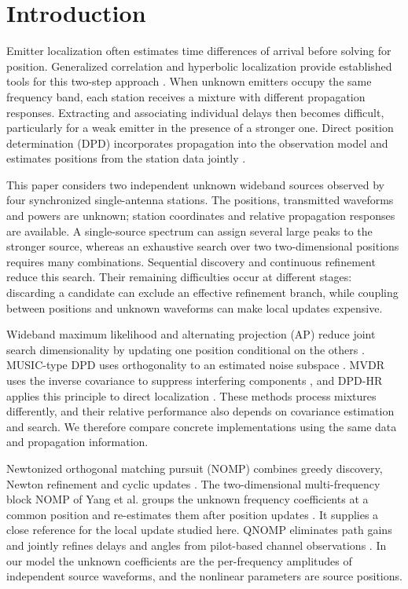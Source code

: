 \documentclass[a4paper,fleqn,review]{cas-sc}
\begin{document}
\FloatBarrier
\section{Introduction}
Emitter localization often estimates time differences of arrival before solving for position. Generalized correlation and hyperbolic localization provide established tools for this two-step approach \cite{KnappCarter1976,ChanHo1994}. When unknown emitters occupy the same frequency band, each station receives a mixture with different propagation responses. Extracting and associating individual delays then becomes difficult, particularly for a weak emitter in the presence of a stronger one. Direct position determination (DPD) incorporates propagation into the observation model and estimates positions from the station data jointly \cite{ChenHudsonYao2002,WeissAmar2005}.

This paper considers two independent unknown wideband sources observed by four synchronized single-antenna stations. The positions, transmitted waveforms and powers are unknown; station coordinates and relative propagation responses are available. A single-source spectrum can assign several large peaks to the stronger source, whereas an exhaustive search over two two-dimensional positions requires many combinations. Sequential discovery and continuous refinement reduce this search. Their remaining difficulties occur at different stages: discarding a candidate can exclude an effective refinement branch, while coupling between positions and unknown waveforms can make local updates expensive.

Wideband maximum likelihood and alternating projection (AP) reduce joint search dimensionality by updating one position conditional on the others \cite{ChenHudsonYao2002}. MUSIC-type DPD uses orthogonality to an estimated noise subspace \cite{WeissAmar2005}. MVDR uses the inverse covariance to suppress interfering components \cite{Capon1969}, and DPD-HR applies this principle to direct localization \cite{TirerWeiss2016}. These methods process mixtures differently, and their relative performance also depends on covariance estimation and search. We therefore compare concrete implementations using the same data and propagation information.

Newtonized orthogonal matching pursuit (NOMP) combines greedy discovery, Newton refinement and cyclic updates \cite{Mamandipoor2016}. The two-dimensional multi-frequency block NOMP of Yang et al. groups the unknown frequency coefficients at a common position and re-estimates them after position updates \cite{Yang2022}. It supplies a close reference for the local update studied here. QNOMP eliminates path gains and jointly refines delays and angles from pilot-based channel observations \cite{Zeng2025}. In our model the unknown coefficients are the per-frequency amplitudes of independent source waveforms, and the nonlinear parameters are source positions.
\end{document}

